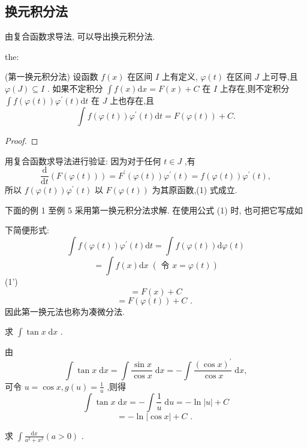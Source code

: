 \subsection{换元积分法}

由复合函数求导法, 可以导出换元积分法.

\begin{theorem}{}{the:}

\end{theorem}
 (第一换元积分法) 设函数 \(f\left( x\right)\) 在区间 \(I\) 上有定义, \(\varphi \left( t\right)\) 在区间 \(J\) 上可导,且 \(\varphi \left( J\right)  \subseteq  I\) . 如果不定积分 \(\int f\left( x\right) \mathrm{d}x = F\left( x\right)  + C\) 在 \(I\) 上存在,则不定积分 \(\int f\left( {\varphi \left( t\right) }\right) {\varphi }^{\prime }\left( t\right) \mathrm{d}t\) 在 \(J\) 上也存在,且
\[
\int f\left( {\varphi \left( t\right) }\right) {\varphi }^{\prime }\left( t\right) \mathrm{d}t = F\left( {\varphi \left( t\right) }\right)  + C. \tag{1}
\]
\begin{proof}

\end{proof}
用复合函数求导法进行验证: 因为对于任何 \(t \in  J\) ,有
\[
\frac{\mathrm{d}}{\mathrm{d}t}\left( {F\left( {\varphi \left( t\right) }\right) }\right)  = {F}^{\prime }\left( {\varphi \left( t\right) }\right) {\varphi }^{\prime }\left( t\right)  = f\left( {\varphi \left( t\right) }\right) {\varphi }^{\prime }\left( t\right) ,
\]
所以 \(f\left( {\varphi \left( t\right) }\right) {\varphi }^{\prime }\left( t\right)\) 以 \(F\left( {\varphi \left( t\right) }\right)\) 为其原函数,(1) 式成立.

下面的例 1 至例 5 采用第一换元积分法求解. 在使用公式 (1) 时, 也可把它写成如

下简便形式:
\[
\int f\left( {\varphi \left( t\right) }\right) {\varphi }^{\prime }\left( t\right) \mathrm{d}t = \int f\left( {\varphi \left( t\right) }\right) \mathrm{d}\varphi \left( t\right)
\]
\[
= \int f\left( x\right) \mathrm{d}x\;\left( {\text{ 令 }x = \varphi \left( t\right) }\right)
\]
 (1')
\[
= F\left( x\right)  + C
\]
\[
= F\left( {\varphi \left( t\right) }\right)  + C\text{ . }
\]
因此第一换元法也称为凑微分法.

\begin{example}

\end{example}
求 \(\int \tan x\mathrm{\;d}x\) .

\begin{solution}

\end{solution}
由
\[
\int \tan x\mathrm{\;d}x = \int \frac{\sin x}{\cos x}\mathrm{\;d}x =  - \int \frac{{\left( \cos x\right) }^{\prime }}{\cos x}\mathrm{\;d}x,
\]
可令 \(u = \cos x,g\left( u\right)  = \frac{1}{u}\) ,则得
\[
\int \tan x\mathrm{\;d}x =  - \int \frac{1}{u}\mathrm{\;d}u =  - \ln \left| u\right|  + C
\]
\[
=  - \ln \left| {\cos x}\right|  + C\text{ . }
\]
\begin{example}

\end{example}
求 \(\int \frac{\mathrm{d}x}{{a}^{2} + {x}^{2}}\left( {a > 0}\right)\) .

